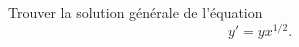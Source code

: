\begin{exercice}\label{EC-0004}
  
Trouver la solution générale de l'équation 
\begin{equation}\nonumber
  y'=yx^{1/2}.
\end{equation}

\end{exercice}
